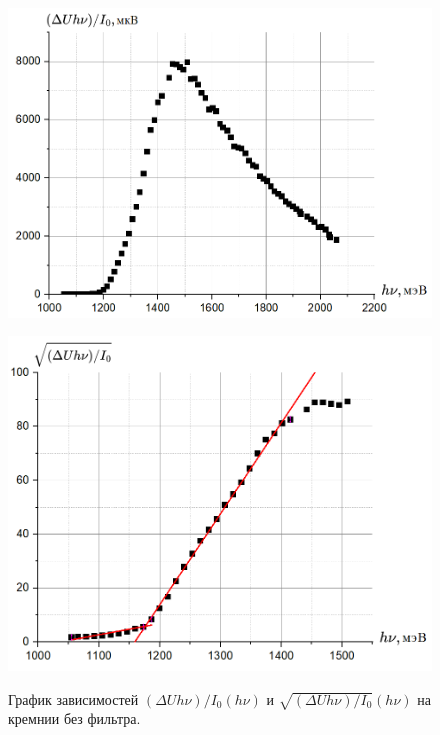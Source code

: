 \documentclass[a4paper, 12pt]{article}
\begin{document}
\begin{figure}[h!]
\begin{center}
\begin{minipage}[h!]{0.495\linewidth}
\label{ris:experimcoded}

\end{minipage}
\caption{}
\end{center}
\end{figure}

 \begin{figure}[h!]
\begin{center}
\begin{minipage}[h!]{0.495\linewidth}
\includegraphics[width=1\linewidth]{img/l7.png}
\label{ris:experimoriginal} %
\end{minipage}
\hfill 
\begin{minipage}[h!]{0.495\linewidth}
\includegraphics[width=1\linewidth]{img/l8.png}

\label{ris:experimcoded}

\end{minipage}
\caption{График зависимостей $(\Delta Uh\nu)/I_0(h\nu)$ и $\sqrt{(\Delta Uh\nu)/I_0}(h\nu)$  на кремнии без фильтра.}
\end{center}
\end{figure}
\end{document}
